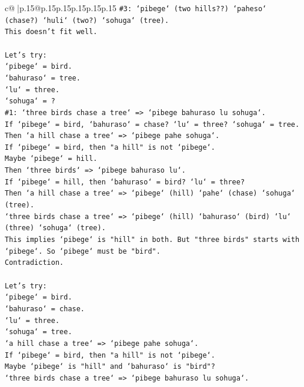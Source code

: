 \documentclass{article}
\begin{document}
{\begin{supertabular}{c@{$\;$}|p{.15\linewidth}@{}p{.15\linewidth}p{.15\linewidth}p{.15\linewidth}p{.15\linewidth}p{.15\linewidth}}
{{{\texttt{\#3: `pibege` (two hills??) `paheso` (chase?) `huli` (two?) `sohuga` (tree).} \\
\texttt{This doesn't fit well.} \\
\\ 
\texttt{Let's try:} \\
\texttt{`pibege` = bird.} \\
\texttt{`bahuraso` = tree.} \\
\texttt{`lu` = three.} \\
\texttt{`sohuga` = ?} \\
\texttt{\#1: `three birds chase a tree` => `pibege bahuraso lu sohuga`.} \\
\texttt{If `pibege` = bird, `bahuraso` = chase? `lu` = three? `sohuga` = tree.} \\
\texttt{Then `a hill chase a tree` => `pibege pahe sohuga`.} \\
\texttt{If `pibege` = bird, then "a hill" is not `pibege`.} \\
\texttt{Maybe `pibege` = hill.} \\
\texttt{Then `three birds` => `pibege bahuraso lu`.} \\
\texttt{If `pibege` = hill, then `bahuraso` = bird? `lu` = three?} \\
\texttt{Then `a hill chase a tree` => `pibege` (hill) `pahe` (chase) `sohuga` (tree).} \\
\texttt{`three birds chase a tree` => `pibege` (hill) `bahuraso` (bird) `lu` (three) `sohuga` (tree).} \\
\texttt{This implies `pibege` is "hill" in both. But "three birds" starts with `pibege`. So `pibege` must be "bird".} \\
\texttt{Contradiction.} \\
\\ 
\texttt{Let's try:} \\
\texttt{`pibege` = bird.} \\
\texttt{`bahuraso` = chase.} \\
\texttt{`lu` = three.} \\
\texttt{`sohuga` = tree.} \\
\texttt{`a hill chase a tree` => `pibege pahe sohuga`.} \\
\texttt{If `pibege` = bird, then "a hill" is not `pibege`.} \\
\texttt{Maybe `pibege` is "hill" and `bahuraso` is "bird"?} \\
\texttt{`three birds chase a tree` => `pibege bahuraso lu sohuga`.} \\
}}}
\end{supertabular}}
\end{document}

